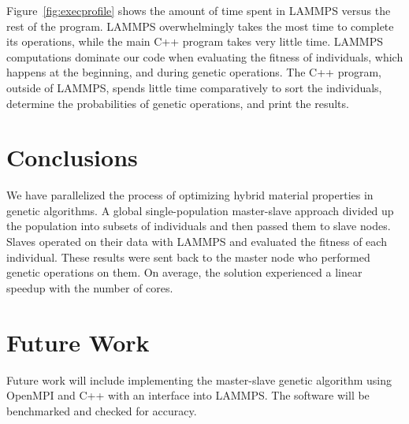 \documentclass[letterpaper, 12pt]{article}
\begin{document}
\begin{flushleft}
Figure~\ref{fig:execprofile} shows the amount of time spent in LAMMPS versus the rest of the program.  LAMMPS overwhelmingly takes the most time to complete its operations, while the main C++ program takes very little time.  LAMMPS computations dominate our code when evaluating the fitness of individuals, which happens at the beginning, and during genetic operations.  The C++ program, outside of LAMMPS, spends little time comparatively to sort the individuals, determine the probabilities of genetic operations, and print the results. \\

\newpage
\section*{Conclusions}
We have parallelized the process of optimizing hybrid material properties in genetic algorithms.  A global single-population master-slave approach  divided up the population into subsets of individuals and then passed them to slave nodes.  Slaves operated on their data with LAMMPS and evaluated the fitness of each individual.  These results were sent back to the master node who performed genetic operations on them.  On average, the solution experienced a linear speedup with the number of cores.

\section*{Future Work}
Future work will include implementing the master-slave genetic algorithm using OpenMPI and C++ with an interface into LAMMPS.  The software will be benchmarked and checked for accuracy.
\newpage
\printbibliography

\end{flushleft}
\end{document}

